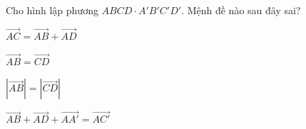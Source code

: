 \begin{question}[type=multiple_choice,difficulty=2,code={I-9}]
Cho hình lập phương $ ABCD \cdot A'B'C'D' $. Mệnh đề nào sau đây sai?

\begin{choice}[label=A]
$ \overrightarrow{AC} = \overrightarrow{AB} + \overrightarrow{AD} $
\end{choice}

\begin{choice}[correct,label=B]
$ \overrightarrow{AB} = \overrightarrow{CD} $
\end{choice}

\begin{choice}[label=C]
$ \left|\overrightarrow{AB}\right| = \left|\overrightarrow{CD}\right| $
\end{choice}

\begin{choice}[label=D]
$ \overrightarrow{AB} + \overrightarrow{AD} + \overrightarrow{AA'} = \overrightarrow{AC'} $
\end{choice}

\end{question}
